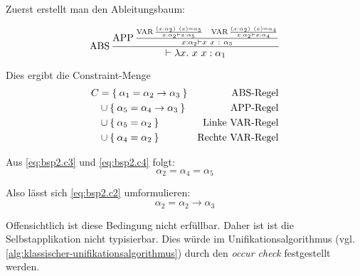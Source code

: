 Zuerst erstellt man den Ableitungsbaum:

\[\ABS\frac{\APP \frac{\VAR \frac{(x:\alpha_2)\ (x) = \alpha_5}{x:\alpha_2 \vdash x: \alpha_5} \;\;\; \VAR \frac{(x:\alpha_2)\ (x) = \alpha_4}{x:\alpha_2 \vdash x:\alpha_4}}{x: \alpha_2 \vdash x\ x\ :\ \alpha_3}}{\vdash \lambda x.\ x\ x: \alpha_1}\]

Dies ergibt die Constraint-Menge
\begin{align}
	C&= \Set{\alpha_1 = \alpha_2 \rightarrow \alpha_3}    &\text{$\operatorname{ABS}$-Regel}\label{eq:bsp2.c1}\\
     &\cup \Set{\alpha_5 = \alpha_4 \rightarrow \alpha_3} &\text{$\operatorname{APP}$-Regel}\label{eq:bsp2.c2}\\
     &\cup \Set{\alpha_5 = \alpha_2}                      &\text{Linke $\operatorname{VAR}$-Regel}\label{eq:bsp2.c3}\\
     &\cup \Set{\alpha_4 = \alpha_2}                      &\text{Rechte $\operatorname{VAR}$-Regel}\label{eq:bsp2.c4}
\end{align}

Aus \cref{eq:bsp2.c3} und \cref{eq:bsp2.c4} folgt:
\[\alpha_2 = \alpha_4 = \alpha_5\]

Also lässt sich \cref{eq:bsp2.c2} umformulieren:
\[\alpha_2 = \alpha_2 \rightarrow \alpha_3\]

Offensichtlich ist diese Bedingung nicht erfüllbar. Daher ist ist die Selbstapplikation
nicht typisierbar. Dies würde im Unifikationsalgorithmus
(vgl. \cref{alg:klassischer-unifikationsalgorithmus})
durch den \textit{occur check} festgestellt werden.